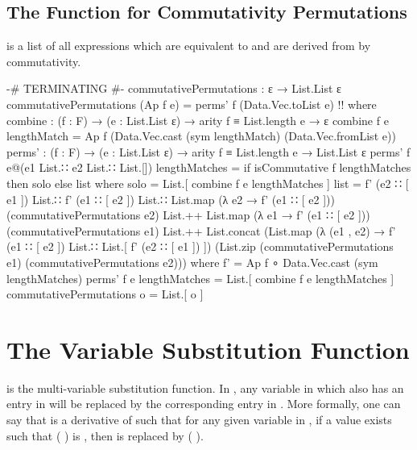\documentclass{report}
\begin{document}
\subsection{The Function for Commutativity Permutations}
  is a list of all expressions which are equivalent to  and are derived from  by commutativity.

\begin{code}
{-# TERMINATING #-}
commutativePermutations : ε → List.List ε
commutativePermutations (Ap f e) = perms' f (Data.Vec.toList e) {!!}
  where
  combine : (f : F) → (e : List.List ε) → arity f ≡ List.length e → ε
  combine f e lengthMatch = Ap f (Data.Vec.cast (sym lengthMatch)
                                                (Data.Vec.fromList e))
  perms' : (f : F) → (e : List.List ε) → arity f ≡ List.length e → List.List ε
  perms' f e@(e1 List.∷ e2 List.∷ List.[]) lengthMatches =
    if isCommutative f lengthMatches then solo else list
    where
    solo = List.[ combine f e lengthMatches ]
    list =
      f' (e2 ∷ [ e1 ]) List.∷ f' (e1 ∷ [ e2 ]) List.∷
      List.map (λ e2 → f' (e1 ∷ [ e2 ])) (commutativePermutations e2) List.++
      List.map (λ e1 → f' (e1 ∷ [ e2 ])) (commutativePermutations e1) List.++
      List.concat (List.map (λ (e1 , e2) → f' (e1 ∷ [ e2 ]) List.∷
                                            List.[ f' (e2 ∷ [ e1 ]) ])
                            (List.zip (commutativePermutations e1)
                                      (commutativePermutations e2)))
      where f' = Ap f ∘ Data.Vec.cast (sym lengthMatches)
  perms' f e lengthMatches = List.[ combine f e lengthMatches ]
commutativePermutations o = List.[ o ]
\end{code}

\section{The Variable Substitution Function}
 is the multi-variable substitution function.  In   , any variable in  which also has an entry in  will be replaced by the corresponding  entry in .  More formally, one can say that    is a derivative of  such that for any given variable  in , if a value  exists such that  \AgdaSymbol(  \AgdaSymbol) is , then  is replaced by  \AgdaSymbol(  \AgdaSymbol).
\end{document}
